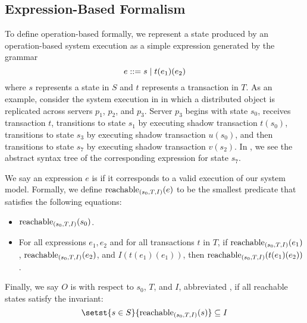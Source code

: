 \subsection{Expression-Based Formalism}
To define operation-based \invariantconfluence{} formally, we represent a state
produced by an operation-based system execution as a simple expression
generated by the grammar
%
\[
  \hfill
  e ::= s \mid t(e_1)(e_2)
  \hfill
\]
%
where $s$ represents a state in $S$ and $t$ represents a transaction in $T$. As
an example, consider the system execution in  in
which a distributed object is replicated across servers $p_1$, $p_2$, and
$p_3$. Server $p_3$ begins with state $s_0$, receives transaction $t$,
transitions to state $s_1$ by executing shadow transaction $t(s_0)$,
transitions to state $s_3$ by executing shadow transaction $u(s_0)$, and then
transitions to state $s_7$ by executing shadow transaction $v(s_2)$.  In
, we see the abstract syntax tree of the corresponding
expression for state $s_7$.

{}

We say an expression $e$ is  if it corresponds to a
valid execution of our system model. Formally, we define
$\text{reachable}_{(s_0, T, I)}(e)$ to be the smallest predicate that satisfies the
following equations:
\begin{itemize}
  \item
    $\text{reachable}_{(s_0, T, I)}(s_0)$.
  \item
    For all expressions $e_1, e_2$ and for all transactions $t$ in $T$, if
    $\text{reachable}_{(s_0, T, I)}(e_1)$, $\text{reachable}_{(s_0, T, I)}(e_2)$, and
    $I(t(e_1)(e_1))$, then $\text{reachable}_{(s_0, T, I)}(t(e_1)(e_2))$.
\end{itemize}

Finally, we say $O$ is \invariantconfluent{} with respect to $s_0$, $T$, and
$I$, abbreviated \sTIconfluent{}, if all reachable states satisfy the
invariant:
\[
  \hfill
  \setst{s \in S}{\sTIreachablepredicate{s}} \subseteq I
  \hfill
\]
